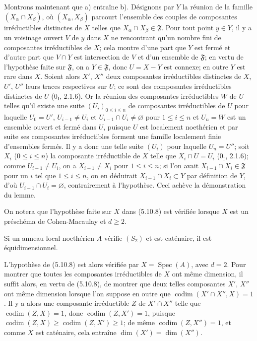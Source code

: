Montrons maintenant que a) entraîne b). Désignons par $Y$ la réunion de la
famille $(X_\alpha\cap X_\beta)$, où $(X_\alpha,X_\beta)$ parcourt l'ensemble
des couples de composantes irréductibles distinctes de $X$ telles que
$X_\alpha\cap X_\beta\in\mathfrak F$. Pour tout point $y\in Y$, il y a un
voisinage ouvert $V$ de $y$ dans $X$ ne rencontrant qu'un nombre fini de
composantes irréductibles de $X$; cela montre d'une part que $Y$ est fermé et
d'autre part que $V\cap Y$ est intersection de $V$ et d'un ensemble de
$\mathfrak F$; en vertu de l'hypothèse faite sur $\mathfrak F$, on a
$Y\in\mathfrak F$, donc $U=X-Y$ est connexe; en outre $Y$ est rare dans $X$.
Soient alors $X'$, $X''$ deux composantes irréductibles distinctes de $X$,
$U'$, $U''$ leurs traces respectives sur $U$; ce sont des composantes
irréductibles distinctes de $U$ (0$_\mathrm I$, 2.1.6). Or la réunion des
composantes irréductibles $W$ de $U$ telles qu'il existe une suite
$(U_i)_{0\leq i\leq n}$ de composantes irréductibles de $U$ pour laquelle
$U_0=U'$, $U_{i-1}\neq U_i$ et $U_{i-1}\cap U_i\neq\varnothing$ pour
$1\leq i\leq n$ et $U_n=W$ est un ensemble ouvert et fermé dans $U$, puisque
$U$ est localement noethérien et par suite ses composantes irréductibles
forment une famille localement finie d'ensembles fermés. Il y a donc une telle
suite $(U_i)$ pour laquelle $U_n=U''$; soit $X_i$ ($0\leq i\leq n$) la
composante irréductible de $X$ telle que $X_i\cap U=U_i$
(0$_\mathrm I$, 2.1.6); comme $U_{i-1}\neq U_i$, on a
$X_{i-1}\neq X_i$ pour $1\leq i\leq n$; si l'on avait
$X_{i-1}\cap X_i\in\mathfrak F$ pour un $i$ tel que $1\leq i\leq n$, on en
déduirait $X_{i-1}\cap X_i\subset Y$ par définition de $Y$, d'où
$U_{i-1}\cap U_i=\varnothing$, contrairement à l'hypothèse. Ceci achève la
démonstration du lemme.

On notera que l'hypothèse faite sur $X$ dans (5.10.8) est vérifiée lorsque $X$
est un préschéma de Cohen-Macaulay et $d\geq2$.

\begin{corollary}[5.10.9]
\label{IV.2.s5.10.9-fr}
Si un anneau local noethérien $A$ vérifie $(S_2)$ et est caténaire, il est
équidimensionnel.
\end{corollary}

L'hypothèse de (5.10.8) est alors vérifiée par $X=\operatorname{Spec}(A)$,
avec $d=2$. Pour montrer que toutes les composantes irréductibles de $X$ ont
même dimension, il suffit alors, en vertu de (5.10.8), de montrer que deux
telles composantes $X'$, $X''$ ont même dimension lorsque l'on suppose en
outre que $\operatorname{codim}(X'\cap X'',X)=1$. Il y a alors une composante
irréductible $Z$ de $X'\cap X''$ telle que
$\operatorname{codim}(Z,X)=1$, donc $\operatorname{codim}(Z,X')=1$, puisque
$\operatorname{codim}(Z,X)\geq\operatorname{codim}(Z,X')\geq1$; de même
$\operatorname{codim}(Z,X'')=1$, et comme $X$ est caténaire, cela entraîne
$\dim(X')=\dim(X'')$.

